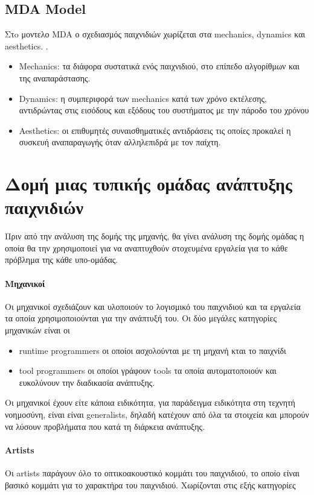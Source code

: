 	\subsection{MDA Model}
	Στo μοντελο \gls{MDA} ο σχεδιασμός παιχνιδιών χωρίζεται στα mechanics, dynamics και aesthetics.
	\cite{mda04}.
	\begin{itemize}
	\item Mechanics: τα διάφορα συστατικά ενός παιχνιδιού, στο επίπεδο αλγορίθμων και της αναπαράστασης.
	\item Dynamics: η συμπεριφορά των mechanics κατά των χρόνο εκτέλεσης, αντιδρώντας στις εισόδους και εξόδους του συστήματος με την πάροδο του χρόνου
	\item Aesthetics: οι επιθυμητές συναισθηματικές αντιδράσεις τις οποίες προκαλεί η συσκευή αναπαραγωγής όταν αλληλεπιδρά με τον παίχτη.	
	\end{itemize}

\section{Δομή μιας τυπικής ομάδας ανάπτυξης παιχνιδιών}
	Πριν από την ανάλυση της δομής της μηχανής, θα γίνει ανάλυση της δομής ομάδας η οποία θα την χρησιμοποιεί για να αναπτυχθούν στοχευμένα εργαλεία για το κάθε πρόβλημα της κάθε υπο-ομάδας.
	
	\paragraph{Μηχανικοί}	
	Οι μηχανικοί σχεδιάζουν και υλοποιούν το λογισμικό του παιχνιδιού και τα εργαλεία τα οποία χρησιμοποιούνται για την ανάπτυξή του. Οι δύο μεγάλες κατηγορίες μηχανικών είναι οι
	\begin{itemize}
		\item runtime programmers οι οποίοι ασχολούνται με τη μηχανή κται το παιχνίδι 
		\item tool programmers οι οποίοι γράφουν tools τα οποία αυτοματοποιούν και ευκολύνουν την διαδικασία ανάπτυξης.
	\end{itemize}
	Οι μηχανικοί έχουν είτε κάποια ειδικότητα, για παράδειγμα ειδικότητα στη τεχνητή νοημοσύνη, είναι είναι generalists, δηλαδή κατέχουν από όλα τα στοιχεία και μπορούν να λύσουν προβλήματα που κατά τη διάρκεια ανάπτυξης.
	
	\paragraph{Artists}
	Οι artists παράγουν όλο το οπτικοακουστικό κομμάτι του παιχνιδιού, το οποίο είναι βασικό κομμάτι για το χαρακτήρα του παιχνιδιού. Χωρίζονται στις εξής κατηγορίες
	
